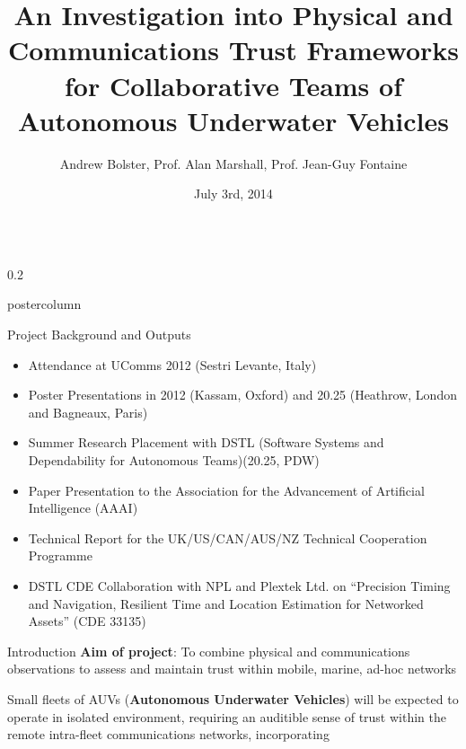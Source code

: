 \documentclass[final,hyperref={pdfpagelabels=false}]{beamer}
\title{\huge An Investigation into Physical and Communications Trust Frameworks \\
for Collaborative Teams of Autonomous Underwater Vehicles}
\author{Andrew Bolster, Prof. Alan Marshall, Prof. Jean-Guy Fontaine }
\institute[UoL]{Advanced Networks Research Group, University of Liverpool, UK}
\date[03/07/14]{July 3rd, 2014}
\def\colwidth{0.2\linewidth}
\begin{document}
\begin{frame}[fragile]
	\begin{columns}[T]
		
		\setlength{\parindent}{1em}
		\begin{column}{\colwidth}
			\begin{beamercolorbox}[center,wd=\textwidth]{postercolumn}
				\begin{minipage}[T]{.99\textwidth}  %
					\parbox[t]{\textwidth}{ %
						\begin{block}{Project Background and Outputs}
							\begin{itemize}
								\item Attendance at UComms 2012 (Sestri Levante, Italy)
								\item Poster Presentations in 2012 (Kassam, Oxford) and 20.25 (Heathrow, London and Bagneaux, Paris)
								\item Summer Research Placement with DSTL (Software Systems and Dependability for Autonomous Teams)(20.25, PDW)
								\item Paper Presentation to the Association for the Advancement of Artificial Intelligence (AAAI) \cite{Bolster2014}
								\item Technical Report for the UK/US/CAN/AUS/NZ Technical Cooperation Programme \cite{Bolster2014a}
								\item DSTL CDE Collaboration with NPL and Plextek Ltd. on ``Precision Timing and Navigation, Resilient Time and Location Estimation for Networked Assets'' (CDE 33135)
							\end{itemize}
						\end{block}
												
						\begin{block}{Introduction}
							\textbf{Aim of project}: To combine physical and communications observations to assess and maintain trust within mobile, marine, ad-hoc networks
														
														 
							\vspace{0.25\baselineskip}
							Small fleets of AUVs (\textbf{Autonomous Underwater Vehicles}) will be expected to operate in isolated environment, requiring an auditible sense of trust within the remote intra-fleet communications networks, incorporating
														

\end{block}}
\end{minipage}
\end{beamercolorbox}
\end{column}
\end{columns}
\end{frame}
\end{document}
